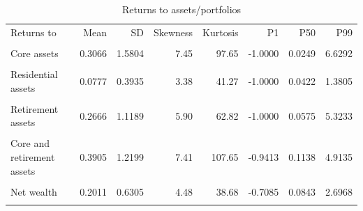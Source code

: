 \begin{table}[htbp]\centering\small
\caption{Returns to assets/portfolios}
\label{tab:returns_portfolio_moments_pooled}
\begin{tabular}{lrrrrrrr}\toprule
Returns to & Mean & SD & Skewness & Kurtosis & P1 & P50 & P99 \\\\ \midrule
Core assets & 0.3066 & 1.5804 & 7.45 & 97.65 & -1.0000 & 0.0249 & 6.6292 \\\\
Residential assets & 0.0777 & 0.3935 & 3.38 & 41.27 & -1.0000 & 0.0422 & 1.3805 \\\\
Retirement assets & 0.2666 & 1.1189 & 5.90 & 62.82 & -1.0000 & 0.0575 & 5.3233 \\\\
\addlinespace
Core and retirement assets & 0.3905 & 1.2199 & 7.41 & 107.65 & -0.9413 & 0.1138 & 4.9135 \\\\
Net wealth & 0.2011 & 0.6305 & 4.48 & 38.68 & -0.7085 & 0.0843 & 2.6968 \\\\
\bottomrule
\end{tabular}
\end{table}
